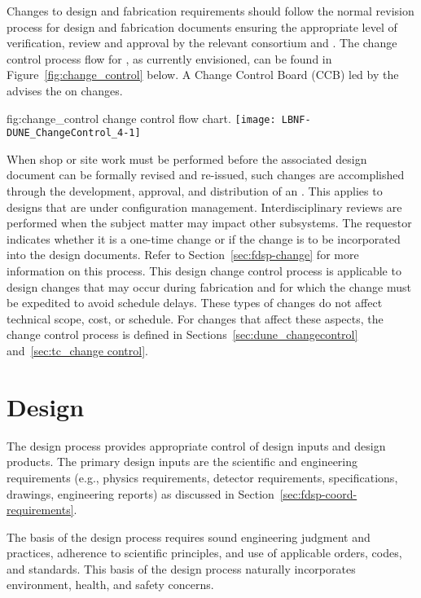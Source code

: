 Changes to design and fabrication requirements should follow the
normal revision process for design and fabrication documents ensuring
the appropriate level of verification, review and approval by the
relevant consortium and . The change control process flow for
, as currently envisioned, can be found in
Figure~\ref{fig:change_control} below. A Change Control Board (CCB)
led by the  advises the  on changes.
\begin{dunefigure}{fig:change_control}
  { change control flow chart.}
  \texttt{[image: LBNF-DUNE\_ChangeControl\_4-1]}
\end{dunefigure}


When shop or site work must be performed before the associated %
design
document can be formally revised and re-issued, such changes are
accomplished through the development, approval, and distribution of an
. This applies to %
designs that are
under configuration management. Interdisciplinary reviews are
performed when the  subject matter may impact other
subsystems. The  requestor  indicates whether it is a one-time
change or if the change is to be incorporated into the design
documents. Refer to Section~\ref{sec:fdsp-change} for more information on this
process.  This design change control process is applicable to design
changes that may occur during fabrication and for which the change must be
expedited to avoid schedule delays. These types of changes do not
affect technical scope, cost, or schedule. For changes that affect these aspects, 
the change control process is defined in
Sections~\ref{sec:dune_changecontrol} and~\ref{sec:tc_change control}.

\section{Design}

The  design process provides appropriate control of design
inputs and design products. The primary design inputs are the
 scientific and engineering requirements (e.g., physics
requirements, detector requirements, specifications, drawings,
engineering reports) as discussed in
Section~\ref{sec:fdsp-coord-requirements}.

The basis of the design process requires sound engineering judgment
and practices, adherence to scientific principles, and use of
applicable orders, codes, and standards. This basis of the design
process naturally incorporates environment, health, and safety
concerns.

